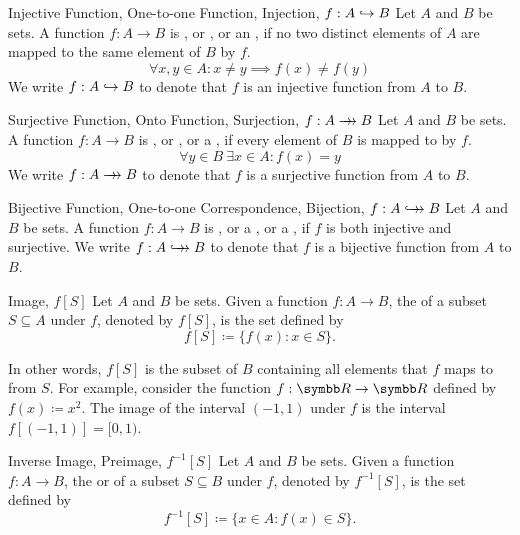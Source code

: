 \documentclass[12pt]{report}
\begin{document}
\begin{dfnbox}{Injective Function, One-to-one Function, Injection, $f: A \hookrightarrow B$}
	Let $A$ and $B$ be sets. A function $f: A \to B$ is , or , or an , if no two distinct elements of $A$ are mapped to the same element of $B$ by $f$.
	\[ \forall x, y \in A : x \ne y \implies f(x) \ne f(y) \]
	We write $f: A \hookrightarrow B$ to denote that $f$ is an injective function from $A$ to $B$.
\end{dfnbox}

\begin{dfnbox}{Surjective Function, Onto Function, Surjection, $f: A \to\!\!\!\!\to B$}
	Let $A$ and $B$ be sets. A function $f: A \to B$ is , or , or a , if every element of $B$ is mapped to by $f$.
	\[ \forall y \in B \ \exists x \in A : f(x) = y \]
	We write $f: A \to\!\!\!\!\to B$ to denote that $f$ is a surjective function from $A$ to $B$.
\end{dfnbox}

\begin{dfnbox}{Bijective Function, One-to-one Correspondence, Bijection, $f: A \hookrightarrow\!\!\!\!\to B$}
	Let $A$ and $B$ be sets. A function $f: A \to B$ is , or a , or a , if $f$ is both injective and surjective. We write $f: A \hookrightarrow\!\!\!\!\to B$ to denote that $f$ is a bijective function from $A$ to $B$.
\end{dfnbox}

\begin{dfnbox}{Image, $f[S]$}
	Let $A$ and $B$ be sets. Given a function $f: A \to B$, the  of a subset $S \subseteq A$ under $f$, denoted by $f[S]$, is the set defined by
	\[ f[S] \coloneq \{ f(x) : x \in S \}. \]
\end{dfnbox}

In other words, $f[S]$ is the subset of $B$ containing all elements that $f$ maps to from $S$. For example, consider the function $f: \R \to \R$ defined by $f(x) \coloneq x^2$. The image of the interval $(-1, 1)$ under $f$ is the interval $f[(-1, 1)] = [0, 1)$.

\begin{dfnbox}{Inverse Image, Preimage, $f^{-1}[S]$}
	Let $A$ and $B$ be sets. Given a function $f: A \to B$, the  or  of a subset $S \subseteq B$ under $f$, denoted by $f^{-1}[S]$, is the set defined by
	\[ f^{-1}[S] \coloneq \{ x \in A : f(x) \in S \}. \]
\end{dfnbox}
\end{document}
